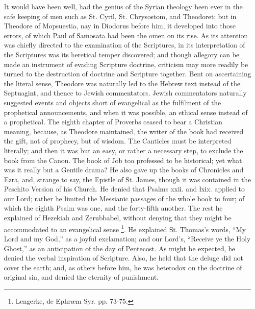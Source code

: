 It would have been well, had the genius of the Syrian theology been
ever in the safe keeping of men such as St. Cyril, St. Chrysostom, and
Theodoret; but in Theodore of Mopsuestia, nay in Diodorus before him,
it developed into those errors, of which Paul of Samosata had been the
omen on its rise. As its attention was chiefly directed to the
examination of the Scriptures, in its interpretation of the Scriptures
was its heretical temper discovered; and though allegory can be made
an instrument of evading Scripture doctrine, criticism may more
readily be turned to the destruction of doctrine and Scripture
together. Bent on ascertaining the literal sense, Theodore was
naturally led to the Hebrew text instead of the Septuagint, and thence
to Jewish commentators. Jewish commentators naturally suggested events
and objects short of evangelical as the fulfilment of the prophetical
announcements, and when it was possible, an ethical sense instead of a
prophetical. The eighth chapter of Proverbs ceased to bear a Christian
meaning, because, as Theodore maintained, the writer of the book had
received the gift, not of prophecy, but of wisdom. The Canticles must
be interpreted literally; and then it was but an easy, or rather a
necessary step, to exclude the book from the Canon. The book of Job
too professed to be historical; yet what was it really but a Gentile
drama? He also gave up the books of Chronicles and Ezra, and, strange
to say, the Epistle of St. James, though it was contained in the
Peschito Version of his Church. He denied that Psalms xxii. and
lxix. applied to our Lord; rather he limited the Messianic passages of
the whole book to four; of which the eighth Psalm was one, and the
forty-fifth another. The rest he explained of Hezekiah and Zerubbabel,
without denying that they might be accommodated to an evangelical
sense \footnote{Lengerke, de Ephræm Syr. pp. 73-75.}. He explained St.
Thomas's words, ``My Lord and my God,'' as a joyful
exclamation; and our Lord's, ``Receive ye the Holy Ghost,'' as
an anticipation of the day of Pentecost. As might be expected, he
denied the verbal inspiration of Scripture. Also, he held that the
deluge did not cover the earth; and, as others before him, he was
heterodox on the doctrine of original sin, and denied the eternity of
punishment.

